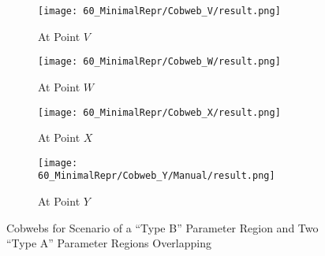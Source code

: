 \begin{figure}
    \centering
    \begin{subfigure}{0.4\textwidth}
        \texttt{[image: 60\_MinimalRepr/Cobweb\_V/result.png]}
        \caption{At Point $V$}
        \label{fig:minrep.cobweb.V}
    \end{subfigure}
    \begin{subfigure}{0.4\textwidth}
        \texttt{[image: 60\_MinimalRepr/Cobweb\_W/result.png]}
        \caption{At Point $W$}
        \label{fig:minrep.cobweb.W}
    \end{subfigure}
    \begin{subfigure}{0.4\textwidth}
        \texttt{[image: 60\_MinimalRepr/Cobweb\_X/result.png]}
        \caption{At Point $X$}
        \label{fig:minrep.cobweb.X}
    \end{subfigure}
    \begin{subfigure}{0.4\textwidth}
        \texttt{[image: 60\_MinimalRepr/Cobweb\_Y/Manual/result.png]}
        \caption{At Point $Y$}
        \label{fig:minrep.cobweb.Y}
    \end{subfigure}
    \caption{Cobwebs for Scenario of a ``Type B'' Parameter Region and Two ``Type A'' Parameter Regions Overlapping}
\end{figure}
